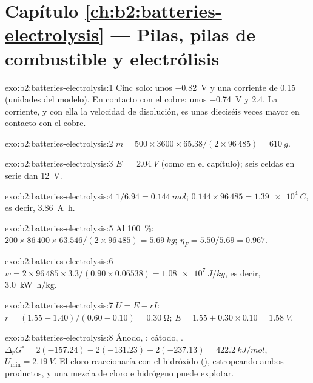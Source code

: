 \section*{Capítulo \ref{ch:b2:batteries-electrolysis} --- Pilas, pilas de combustible y electrólisis}

\begin{solution}{exo:b2:batteries-electrolysis:1}
Cinc solo: unos \qty{-0.82}{V} y una corriente de 0.15 (unidades del modelo). En contacto con el
cobre: unos \qty{-0.74}{V} y 2.4. La corriente, y con ella la velocidad de disolución, es
unas dieciséis veces mayor en contacto con el cobre.
\end{solution}

\begin{solution}{exo:b2:batteries-electrolysis:2}
$m = 500 \times 3600 \times 65.38/(2 \times 96\,485) = \qty{610}{g}$.
\end{solution}

\begin{solution}{exo:b2:batteries-electrolysis:3}
$E^\circ = \qty{2.04}{V}$ (como en el capítulo); seis celdas en serie dan
\qty{12}{V}.
\end{solution}

\begin{solution}{exo:b2:batteries-electrolysis:4}
$1/6.94 = \qty{0.144}{mol}$; $0.144 \times 96\,485 = \qty{1.39e4}{C}$, es decir,
\qty{3.86}{A.h}.
\end{solution}

\begin{solution}{exo:b2:batteries-electrolysis:5}
Al 100~\%: $200 \times 86\,400 \times 63.546/(2 \times 96\,485) = \qty{5.69}{kg}$;
$\eta_F = 5.50/5.69 = 0.967$.
\end{solution}

\begin{solution}{exo:b2:batteries-electrolysis:6}
$w = 2 \times 96\,485 \times 3.3/(0.90 \times 0.06538) = \qty{1.08e7}{J/kg}$, es decir,
\qty{3.0}{kW.h/kg}.
\end{solution}

\begin{solution}{exo:b2:batteries-electrolysis:7}
$U = E - rI$: $r = (1.55 - 1.40)/(0.60 - 0.10) = \qty{0.30}{\ohm}$; $E = 1.55 + 0.30
\times 0.10 = \qty{1.58}{V}$.
\end{solution}

\begin{solution}{exo:b2:batteries-electrolysis:8}
Ánodo, ; cátodo, . $\Delta_r G^\circ =
2(-157.24) - 2(-131.23) - 2(-237.13) = \qty{422.2}{kJ/mol}$, $U_{\min} =
\qty{2.19}{V}$. El cloro reaccionaría con el hidróxido (), estropeando ambos productos, y una mezcla de cloro e hidrógeno
puede explotar.
\end{solution}

